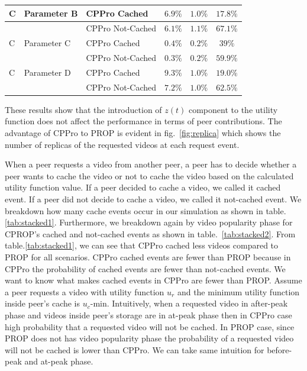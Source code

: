\documentclass[10pt,final,journal,a4paper]{IEEEtran}
\begin{document}
\begin{table}[!t]
\begin{tabular}{|l|l|l|c|c|c|}
C & Parameter B & CPPro Cached & $6.9\%$ & $1.0\%$ & $17.8\%$ \\
\hline
 & & CPPro Not-Cached & $6.1\%$ & $1.1\%$ & $67.1$\% \\
\hline

C & Parameter C & CPPro Cached & $0.4\%$ & $0.2\%$ & $39\%$ \\
\hline
 & & CPPro Not-Cached & $0.3\%$ & $0.2\%$ & $59.9\%$ \\
\hline

C & Parameter D & CPPro Cached & $9.3\%$ & $1.0\%$ & $19.0\%$ \\
\hline
 & & CPPro Not-Cached & $7.2\%$ & $1.0\%$ & $62.5\%$ \\
\hline

\end{tabular}
\end{table}


These results show that the introduction of $z(t)$ component to the utility function does not affect the performance in terms of peer contributions.
The advantage of CPPro to PROP is evident in fig.~\ref{fig:replica} which shows the number of replicas of the requested videos at each request event.


When a peer requests a video from another peer, a peer has to decide whether a peer wants to cache the video or not to cache the video based on the calculated utility function value.  
If a peer decided to cache a video, we called it cached event.
If a peer did not decide to cache a video, we called it not-cached event.
We breakdown how many cache events occur in our simulation as shown in table.\ref{tab:stacked1}.
Furthermore, we breakdown again by video popularity phase for CPROP's cached and not-cached events as shown in table.~\ref{tab:stacked2}.
From table.\ref{tab:stacked1}, we can see that CPPro cached less videos compared to PROP for all scenarios.
CPPro cached events are fewer than PROP because in CPPro the probability of cached events are fewer than not-cached events. 
We want to know what makes cached events in CPPro are fewer than PROP.
Assume a peer requests a video with utility function $u_r$ and the minimum utility function inside peer's cache is $u_c$-min. %
Intuitively, when a requested video in after-peak phase and  videos inside peer's storage are in at-peak phase then in CPPro case high probability that a requested video will not be cached.  
In PROP case, since PROP does not has video popularity phase the probability of a requested video will not be cached is lower than CPPro.
We can take same intuition for before-peak and at-peak phase.
\end{document}
